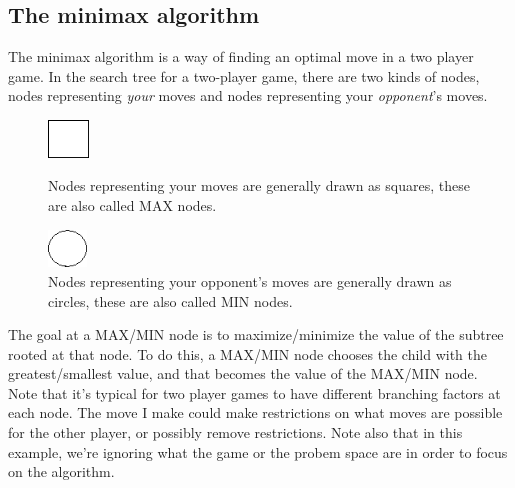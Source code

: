 \subsection{The minimax algorithm}
The minimax algorithm is a way of finding an optimal move in a two player game. In the search tree for a two-player game, there are two kinds of nodes, nodes representing \textit{your} moves and nodes representing your \textit{opponent}'s moves.
\begin{figure}[H]
\centering
	\begin{minipage}[b]{0.45\linewidth}
		\centering
		\includegraphics[height=1cm]{2_State_of_the_art/Arimaa_on_MCTS_Benoit/img/max.png}
		\caption{\label{fig:max}Nodes representing your moves are generally drawn as squares, these are also called MAX nodes.}
	\end{minipage}%
	\hspace*{1cm}
	\begin{minipage}[b]{0.45\linewidth}
		\centering
		\includegraphics[height=1cm]{2_State_of_the_art/Arimaa_on_MCTS_Benoit/img/min.png}
		\caption{\label{fig:min}Nodes representing your opponent's moves are generally drawn as circles, these are also called MIN nodes.}
	\end{minipage}%
\end{figure}
\noindent
The goal at a MAX/MIN node is to maximize/minimize the value of the subtree rooted at that node. To do this, a MAX/MIN node chooses the child with the greatest/smallest value, and that becomes the value of the MAX/MIN node.\\
Note that it's typical for two player games to have different branching factors at each node. The move I make could make restrictions on what moves are possible for the other player, or possibly remove restrictions. Note also that in this example, we're ignoring what the game or the probem space are in order to focus on the algorithm.

